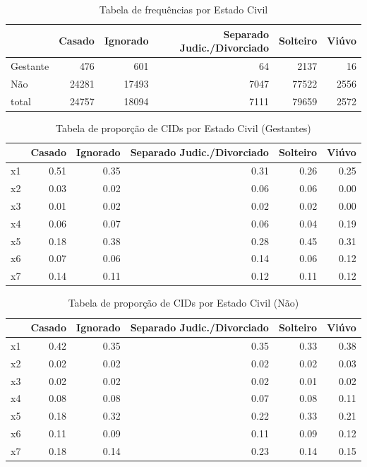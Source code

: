 \documentclass[
]{article}
\begin{document}
\begin{table}

\caption{\label{tab:unnamed-chunk-9}Tabela de frequências por Estado Civil}
\centering
\begin{tabular}[t]{l|r|r|r|r|r}
\hline
  & Casado & Ignorado & Separado Judic./Divorciado & Solteiro & Viúvo\\
\hline
Gestante & 476 & 601 & 64 & 2137 & 16\\
\hline
Não & 24281 & 17493 & 7047 & 77522 & 2556\\
\hline
total & 24757 & 18094 & 7111 & 79659 & 2572\\
\hline
\end{tabular}
\end{table}

\begin{table}

\caption{\label{tab:unnamed-chunk-9}Tabela de proporção de CIDs por Estado Civil (Gestantes)}
\centering
\begin{tabular}[t]{l|r|r|r|r|r}
\hline
  & Casado & Ignorado & Separado Judic./Divorciado & Solteiro & Viúvo\\
\hline
x1 & 0.51 & 0.35 & 0.31 & 0.26 & 0.25\\
\hline
x2 & 0.03 & 0.02 & 0.06 & 0.06 & 0.00\\
\hline
x3 & 0.01 & 0.02 & 0.02 & 0.02 & 0.00\\
\hline
x4 & 0.06 & 0.07 & 0.06 & 0.04 & 0.19\\
\hline
x5 & 0.18 & 0.38 & 0.28 & 0.45 & 0.31\\
\hline
x6 & 0.07 & 0.06 & 0.14 & 0.06 & 0.12\\
\hline
x7 & 0.14 & 0.11 & 0.12 & 0.11 & 0.12\\
\hline
\end{tabular}
\end{table}

\begin{table}

\caption{\label{tab:unnamed-chunk-9}Tabela de proporção de CIDs por Estado Civil  (Não)}
\centering
\begin{tabular}[t]{l|r|r|r|r|r}
\hline
  & Casado & Ignorado & Separado Judic./Divorciado & Solteiro & Viúvo\\
\hline
x1 & 0.42 & 0.35 & 0.35 & 0.33 & 0.38\\
\hline
x2 & 0.02 & 0.02 & 0.02 & 0.02 & 0.03\\
\hline
x3 & 0.02 & 0.02 & 0.02 & 0.01 & 0.02\\
\hline
x4 & 0.08 & 0.08 & 0.07 & 0.08 & 0.11\\
\hline
x5 & 0.18 & 0.32 & 0.22 & 0.33 & 0.21\\
\hline
x6 & 0.11 & 0.09 & 0.11 & 0.09 & 0.12\\
\hline
x7 & 0.18 & 0.14 & 0.23 & 0.14 & 0.15\\
\hline
\end{tabular}
\end{table}
\end{document}
